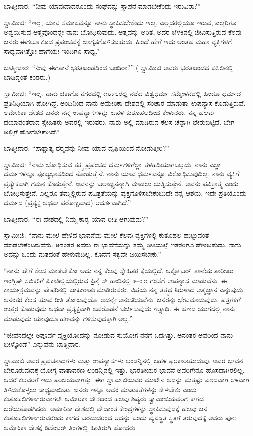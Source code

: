  ಬಾತ್ಮೀದಾರ: “ನೀವು ಯಾವುದಾದರೊಂದು ಸಂಘವನ್ನು ಸ್ಥಾಪನೆ ಮಾಡಬೇಕೆಂದು ಇರುವಿರಾ?” 

 ಸ್ವಾಮೀಜಿ: “ಇಲ್ಲ, ಯಾವ ಸಮಾಜವನ್ನೂ ನಾನು ಸ್ಥಾಪಿಸಬೇಕೆಂದು ಇಲ್ಲ. ಎಲ್ಲದರಲ್ಲಿಯೂ ಇರುವ, ಎಲ್ಲರಿಗೂ ಅನ್ವಯಿಸುವ ಆತ್ಮವೊಂದನ್ನೇ ನಾನು ಬೋಧಿಸುವುದು. ಆತ್ಮವನ್ನು ಅರಿತ, ಅದರ ಬೆಳಕಿನಲ್ಲಿ ಜೀವಿಸುತ್ತಿರುವ ಕೆಲವು ಜನರು ಈಗಲೂ ಕೂಡ ಪ್ರಪಂಚವನ್ನೆ ಜಾಗೃತಗೊಳಿಸಬಹುದು. ಹಿಂದೆ ಹೇಗೆ ಇದು ಅಂತಹ ಮಹಾ ವ್ಯಕ್ತಿಗಳಿಗೆ ಸಾಧ್ಯವಾಗಿತ್ತೋ ಹಾಗೆಯೇ ಇಂದಿಗೂ ಸಾಧ್ಯ.” 

 ಬಾತ್ಮೀದಾರ: “ನೀವು ಈಗತಾನೆ ಭರತಖಂಡದಿಂದ ಬಂದಿರಾ?” ( ಸ್ವಾಮೀಜಿ ಅವರು ಭರತಖಂಡದ ಬಿಸಿಲಿನಲ್ಲಿ ಬಾಡಿದ್ದಂತೆ ಕಂಡರು.) 

 ಸ್ವಾಮೀಜಿ: “ಇಲ್ಲ. ನಾನು ಚಿಕಾಗೊ ನಗರದಲ್ಲಿ ೧೮೯೩ರಲ್ಲಿ ನಡೆದ ವಿಶ್ವಧರ್ಮ ಸಮ್ಮೇಳನದಲ್ಲಿ ಹಿಂದೂ ಧರ್ಮದ ಪ್ರತಿನಿಧಿಯಾಗಿ ಹೋಗಿದ್ದೆ. ಅಂದಿನಿಂದ ನಾನು ಅಮೇರಿಕಾ ದೇಶದಲ್ಲಿ ಸಂಚಾರ ಮಾಡುತ್ತಾ ಉಪನ್ಯಾಸ ಕೊಡುತ್ತಿರುವೆ. ಅಮೇರಿಕಾ ದೇಶದ ಜನರು ನನ್ನ ಉಪನ್ಯಾಸಗಳನ್ನು ಬಹಳ ಕುತೂಹಲದಿಂದ ಕೇಳುವರು. ನನ್ನ ಹಲವು ದಯಾವಂತರಾದ ಸ್ನೇಹಿತರು ಅವರಲ್ಲಿ ಇರುವರು. ನಾನು ಅಲ್ಲಿ ಮಾಡಿರುವ ಕೆಲಸ ಚೆನ್ನಾಗಿ ಬೇರುಬಿಟ್ಟಿದೆ. ಬೇಗ ಅಲ್ಲಿಗೆ ಹೋಗಬೇಕಾಗಿದೆ.” 

 ಬಾತ್ಮೀದಾರ: “ಪಾಶ್ಚಾತ್ಯ ಧರ‍್ಮವನ್ನು ನೀವು ಯಾವ ದೃಷ್ಟಿಯಿಂದ ನೋಡುತ್ತೀರಿ?” 

 ಸ್ವಾಮೀಜಿ: “ನಾನು ಬೋಧಿಸುವ ತತ್ತ್ವ ಪ್ರಪಂಚದ ಧರ್ಮಗಳಿಗೆಲ್ಲಾ ತಳಹದಿಯಾಗಬಲ್ಲದು. ನಾನು ಎಲ್ಲಾ ಧರ್ಮಗಳನ್ನೂ ಪೂಜ್ಯಭಾವದಿಂದ ನೋಡುತ್ತೇನೆ. ನಾನು ಯಾವ ಧರ್ಮವನ್ನೂ ವಿರೋಧಿಸುವುದಿಲ್ಲ. ನಾನು ವ್ಯಕ್ತಿಗೆ ಪ್ರತ್ಯೇಕವಾಗಿ ಗಮನ ಕೊಡುತ್ತೇನೆ. ಅವನನ್ನು ಬಲಾಢ್ಯನನ್ನಾಗಿ ಮಾಡಲು ಯತ್ನಿಸುತ್ತೇನೆ. ಅವನು ಪವಿತ್ರಾತ್ಮ ಎಂದು ಬೋಧಿಸುತ್ತೇನೆ. ಎಲ್ಲರೂ ತಮ್ಮಲ್ಲಿರುವ ಪವಿತ್ರತೆಯನ್ನು ವ್ಯಕ್ತಗೊಳಿಸಬೇಕೆಂಬುದೇ ನನ್ನ ಆಶಯ. ಇದೇ ಪ್ರತಿಯೊಂದು ಧರ್ಮದ (ಪ್ರತ್ಯಕ್ಷ ಅಥವಾ ಪರೋಕ್ಷವಾದ) ಆದರ್ಶವಾಗಿದೆ.” 

 ಬಾತ್ಮೀದಾರ: “ಈ ದೇಶದಲ್ಲಿ ನಿಮ್ಮ ಕಾರ‍್ಯ ಯಾವ ರೀತಿ ಆಗುವುದು?” 

 ಸ್ವಾಮೀಜಿ: “ನಾನು ಮೇಲೆ ಹೇಳಿದ ಭಾವನೆಯ ಮೇಲೆ ಕೆಲವು ವ್ಯಕ್ತಿಗಳಲ್ಲಿ ಕುತೂಹಲ ಹುಟ್ಟುವಂತೆ ಮಾಡಬೇಕೆಂದಿರುವೆನು. ಅನಂತರ ಅವರು ಈ ಭಾವನೆಯನ್ನು ತಮ್ಮ ರೀತಿಯಲ್ಲೆ ಇತರರಿಗೂ ಹೇಳಬಹುದು. ನಾನು ಅದನ್ನು ಒಂದು ಮತದಂತೆ ಹೇಳುವುದಿಲ್ಲ. ಕೊನೆಗೆ ಸತ್ಯವೇ ಜಯಿಸಬೇಕು.” 

 “ನಾನು ಹೇಗೆ ಕೆಲಸ ಮಾಡಬೇಕೋ ಅದು ನನ್ನ ಕೆಲವು ಸ್ನೇಹಿತರ ಕೈಯಲ್ಲಿದೆ. ಅಕ್ಟೋಬರ್ ೨೨ನೆಯ ತಾರೀಖು ಇಂಗ್ಲಿಷ್ ಸಭಿಕರಿಗೆ ಪಿಕಾಡಿಲ್ಲಿಯಲ್ಲಿರುವ ಪ್ರಿನ್ಸೆ ಸ್ ಹಾಲಿನಲ್ಲಿ ೫–೩೦ ಗಂಟೆಗೆ ಉಪನ್ಯಾಸ ಮಾಡುವೆನು. ಈ ಕಾರ್ಯಕ್ರಮವನ್ನು ಪೇಪರಿನಲ್ಲಿ ಜಾಹೀರಾತು ಮಾಡಿರುವರು. ವಿಷಯ ನನ್ನ ತತ್ತ್ವದ ತಿರುಳಾದ ಆತ್ಮಜ್ಞಾನ ಎನ್ನುವುದು. ಅನಂತರ ಕೆಲಸ ಯಾವ ರೀತಿ ತೋರುವುದೋ ಅದನ್ನೇ ಅನುಸರಿಸುವೆನು. ಜನರನ್ನು ಭೇಟಿಮಾಡುವುದು, ಪತ್ರಗಳಿಗೆ ಉತ್ತರ ಕೊಡುವುದು ಅಥವಾ ಪ್ರತ್ಯಕ್ಷವಾಗಿ ಅವರೊಡನೆ ಚರ್ಚಿಸುವುದು ಇತ್ಯಾದಿ. ಈ ಹಣದ ಯುಗದಲ್ಲಿ ನಾನು ಮಾಡುವುದು ಯಾವುದೂ ಹಣವನ್ನು ಗಳಿಸುವುದಕ್ಕಾಗಿ ಅಲ್ಲ.” 

 “ಜೀವನದಲ್ಲೇ ಅಪೂರ್ವ ವ್ಯಕ್ತಿಯೊಂದನ್ನು ನೋಡುವ ಸುಯೋಗ ನನಗೆ ಒದಗಿತ್ತು. ಅನಂತರ ಅವರಿಂದ ನಾನು ಬೀಳ್ಕೊಂಡೆ” ಎನ್ನುವನು ಬಾತ್ಮಿದಾರ. 

 ಸ್ವಾಮೀಜಿ ಅವರ ಪ್ರವಚನಾದಿಗಳು ಮತ್ತು ಉಪನ್ಯಾಸಗಳು ಲಂಡನ್ನಿನಲ್ಲಿ ಬಹಳ ಫಲಕಾರಿಯಾದುವು. ಅವರ ಭಾವನೆ ಬೇರೂರುವುದಕ್ಕೆ ಯೋಗ್ಯ ವಾತಾವರಣ ಲಂಡನ್ನಿನಲ್ಲಿ ಇತ್ತು. ಭಾರತೀಯರ ಭಾವನೆ ಅವರಿಗೇನೂ ಹೊಸದಾಗಿರಲಿಲ್ಲ. ಆದರೆ ಕೆಲವರಿಗೆ ಇದು ಪರಿಚಯವಾಗಿತ್ತು. ಈಗ ಸ್ವಾಮೀಜಿಯವರ ಮುಖೇನ ಅದನ್ನು ಮತ್ತಷ್ಟು ವಿಶದವಾಗಿ ಆಳವಾಗಿ ತಿಳಿದುಕೊಳ್ಳಲು ಸಾಧ್ಯವಾಯಿತು. ಜನರು ಇನ್ನೂ ಅವರ ಮಾತುಕತೆಗಳನ್ನು ಕೇಳಬೇಕು ಎಂದು ಕುತೂಹಲಿಗಳಾಗಿರುವಾಗಲೇ ಅಮೇರಿಕಾ ದೇಶದಿಂದ ಹಲವು ಶಿಷ್ಯರು ಸ್ವಾಮೀಜಿಯವರಿಗೆ ಕಾಗದ ಬರೆಯತೊಡಗಿದರು. ಅಮೇರಿಕಾ ದೇಶದಲ್ಲಿ ವೇದಾಂತ ಕೇಂದ್ರಗಳನ್ನು ಸ್ಥಾಪಿಸುವುದಕ್ಕೆ ಹಲವು ಜನ ಕುತೂಹಲಿಗಳಾಗಿರುವರೆಂದು ಕಾಗದ ಬರೆದುದರಿಂದ ಅದನ್ನು ಒಂದು ವ್ಯವಸ್ಥಿತ ಸ್ಥಿತಿಗೆ ತರುವುದಕ್ಕೆ ಅವರು ಪುನಃ ಅಮೇರಿಕಾ ದೇಶಕ್ಕೆ ಡಿಸೆಂಬರ್ ತಿಂಗಳಲ್ಲಿ ಹಿಂತಿರುಗಿ ಹೋದರು. 

